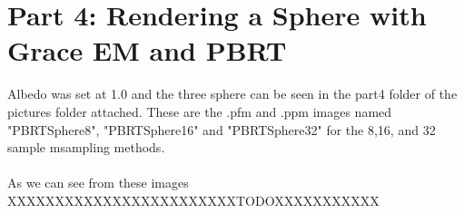 \documentclass{article}
\begin{document}
\section{Part 4: Rendering a Sphere with Grace EM and PBRT}
Albedo was set at 1.0 and the three sphere can be seen in the
part4 folder of the pictures folder attached. These are the
.pfm and .ppm images named "PBRTSphere8", 
"PBRTSphere16" and "PBRTSphere32" for the 8,16, and
32 sample msampling methods.\\
\\
As we can see from these images XXXXXXXXXXXXXXXXXXXXXXXXTODOXXXXXXXXXXX
\end{document}
